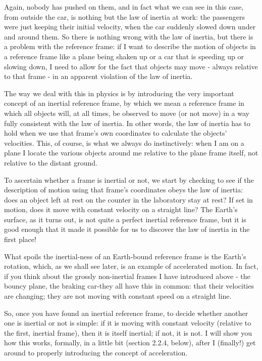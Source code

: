 \documentclass[10pt]{article}
\begin{document}
Again, nobody has pushed on them, and in fact what we can see in this case, from outside the car, is nothing but the law of inertia at work: the passengers were just keeping their initial velocity, when the car suddenly slowed down under and around them. So there is nothing wrong with the law of inertia, but there is a problem with the reference frame: if I want to describe the motion of objects in a reference frame like a plane being shaken up or a car that is speeding up or slowing down, I need to allow for the fact that objects may move - always relative to that frame - in an apparent violation of the law of inertia.

The way we deal with this in physics is by introducing the very important concept of an inertial reference frame, by which we mean a reference frame in which all objects will, at all times, be observed to move (or not move) in a way fully consistent with the law of inertia. In other words, the law of inertia has to hold when we use that frame's own coordinates to calculate the objects' velocities. This, of course, is what we always do instinctively: when I am on a plane I locate the various objects around me relative to the plane frame itself, not relative to the distant ground.

To ascertain whether a frame is inertial or not, we start by checking to see if the description of motion using that frame's coordinates obeys the law of inertia: does an object left at rest on the counter in the laboratory stay at rest? If set in motion, does it move with constant velocity on a straight line? The Earth's surface, as it turns out, is not quite a perfect inertial reference frame, but it is good enough that it made it possible for us to discover the law of inertia in the first place!

What spoils the inertial-ness of an Earth-bound reference frame is the Earth's rotation, which, as we shall see later, is an example of accelerated motion. In fact, if you think about the grossly non-inertial frames I have introduced above - the bouncy plane, the braking car-they all have this in common: that their velocities are changing; they are not moving with constant speed on a straight line.

So, once you have found an inertial reference frame, to decide whether another one is inertial or not is simple: if it is moving with constant velocity (relative to the first, inertial frame), then it is itself inertial; if not, it is not. I will show you how this works, formally, in a little bit (section 2.2.4, below), after I (finally!) get around to properly introducing the concept of acceleration.
\end{document}
